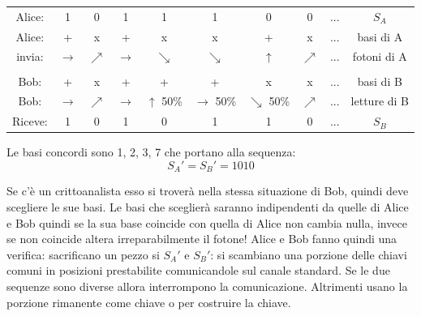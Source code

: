 \begin{table}[ht!]
    \centering
    \begin{tabular}{c|c c c c c c c c | c}
        Alice: & 1 & 0 & 1 & 1 & 1 & 0 & 0 & ... & $S_A$ \\
        Alice: & + & x & + & x & x & + & x & ... & basi di A \\
        invia: & $\rightarrow$ & $\nearrow$ & $\rightarrow$ & $\searrow$ & $\searrow$ & $\uparrow$ & $\nearrow$ & ... & fotoni di A \\
    
        & & & & & & & & & \\

        Bob: & + & x & + & + & + & x & x & ... & basi di B \\
        Bob: & $\rightarrow$ & $\nearrow$ & $\rightarrow$ & $\uparrow$ 50\% & $\rightarrow$ 50\% & $\searrow$ 50\% & $\nearrow$ & ... & letture di B \\
        Riceve: & 1 & 0 & 1 & 0 & 1 & 1 & 0 & ... & $S_B$ \\
    \end{tabular}
\end{table}

Le basi concordi sono 1, 2, 3, 7 che portano alla sequenza:
$$ S_A' = S_B' = 1010 $$

Se c'è un crittoanalista esso si troverà nella stessa situazione di Bob, quindi deve scegliere le sue basi.
Le basi che sceglierà saranno indipendenti da quelle di Alice e Bob quindi se la sua base coincide con quella di Alice non cambia nulla, invece se non coincide altera irreparabilmente il fotone!
Alice e Bob fanno quindi una verifica: sacrificano un pezzo si $S_A'$ e $S_B'$:
si scambiano una porzione delle chiavi comuni in posizioni prestabilite comunicandole sul canale standard.
Se le due sequenze sono diverse allora interrompono la comunicazione.
Altrimenti usano la porzione rimanente come chiave o per costruire la chiave.


